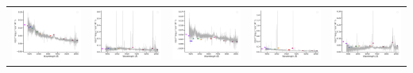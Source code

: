 \begin{center}
\begin{longtable}{l l l l l }
    \includegraphics[width=0.2\linewidth, clip]{Figs/Figs-sdss/spec-0687-52518-0474-STRIPE82-0008-013742.pdf} & \includegraphics[width=0.2\linewidth, clip]{Figs/Figs-sdss/spec-0688-52203-0315-STRIPE82-0007-044146.pdf} & \includegraphics[width=0.2\linewidth, clip]{Figs/Figs-sdss/spec-0689-52262-0087-STRIPE82-0013-019963.pdf} & \includegraphics[width=0.2\linewidth, clip]{Figs/Figs-sdss/spec-0689-52262-0247-STRIPE82-0011-015494.pdf} & \includegraphics[width=0.2\linewidth, clip]{Figs/Figs-sdss/spec-0689-52262-0468-STRIPE82-0012-027933.pdf} \\

\end{longtable}
\end{center}
